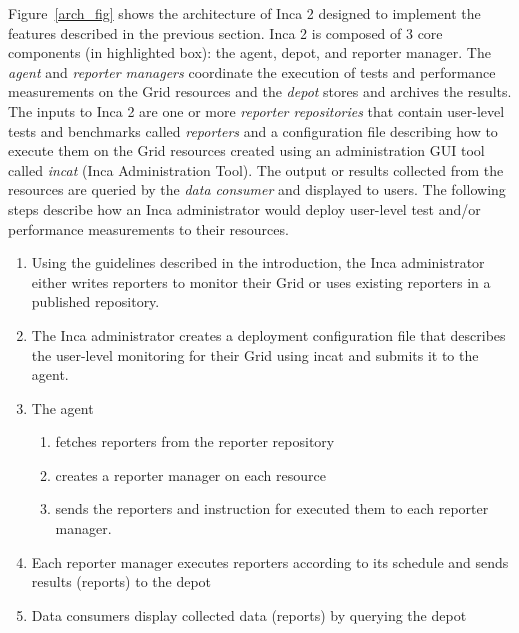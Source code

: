 \documentclass[times,10pt,twocolumn]{article}
\begin{document}

\begin{figure*}[htb]
  \centering
  \mbox{}
  \caption{\label{arch_fig} Inca architecture.}
\end{figure*}

Figure~\ref{arch_fig} shows the architecture of Inca 2 designed to implement
the features described in the previous section.  Inca 2 is composed of 3 core
components (in highlighted box):  the agent, depot, and reporter manager.
The \textit{agent} and \textit{reporter managers} coordinate the execution of
tests and performance measurements on the Grid resources and the
\textit{depot} stores and archives the results.  The inputs to Inca 2 are one
or more \textit{reporter repositories} that contain user-level tests and
benchmarks called \textit{reporters} and a configuration file describing how
to execute them on the Grid resources created using an administration GUI tool
called \textit{incat} (Inca Administration Tool).  The output or results
collected from the resources are queried by the \textit{data consumer} and
displayed to users.  The following steps describe how an Inca administrator
would deploy user-level test and/or performance measurements to their
resources.

\begin{enumerate}

\item Using the guidelines described in the introduction, the Inca
administrator either writes reporters to monitor their Grid or uses existing
reporters in a published repository.

\item The Inca administrator creates a deployment configuration file that
describes the user-level monitoring for their Grid using incat and submits it
to the agent.

\item The agent
  \begin{enumerate}
    \item fetches reporters from the reporter repository
    \item creates a reporter manager on each resource
    \item sends the reporters and instruction for executed them to each reporter manager.
  \end{enumerate}

\item Each reporter manager executes reporters according to its schedule and
sends results (reports) to the depot

\item Data consumers display collected data (reports) by querying the depot
\end{enumerate}
\end{document}
